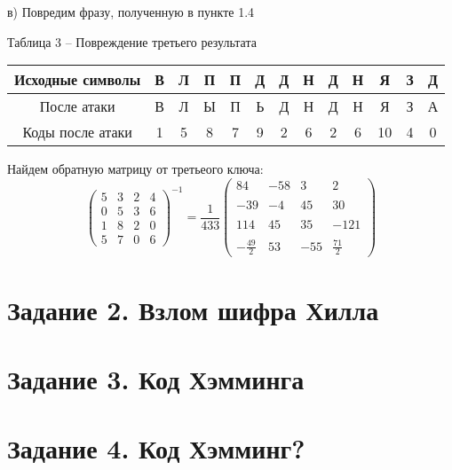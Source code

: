\documentclass[a5paper, 10pt]{article}
\theoremstyle{definition}
\theoremstyle{plain}
\theoremstyle{remark}
\begin{document}
 в) Повредим фразу, полученную в пункте 1.4
\begin{center}
Таблица 3 -- Повреждение третьего результата\\
\begin{tabular}{ |c|c|c|c|c|c|c|c|c|c|c|c|c| } 
 \hline
Исходные символы & В & Л & П & П & Д  & Д & Н  & Д & Н  & Я & З  & Д\\
\hline
После атаки  & В & Л & Ы & П & Ь  & Д & Н  & Д & Н  & Я & З  & А \\
 \hline
Коды после атаки & 1 & 5 & 8 & 7 & 9  & 2 & 6  & 2 & 6  & 10 & 4  & 0  \\
 \hline
\end{tabular}
\end{center}
Найдем обратную матрицу от третьеого ключа:
\begin{equation}
\begin{pmatrix}
 5 & 3 & 2 & 4 \\
 0 & 5 & 3 & 6 \\
1& 8 & 2 & 0\\
 5 & 7 & 0 & 6
\end{pmatrix}^{-1}
=  \frac{1}{433}\begin{pmatrix}
  84 & -58 & 3 & 2 \\
\\
 -39 & -4 & 45 & 30 \\
\\
114 & 45 & 35 & -121\\
\\
 - \frac{49}{2} & 53 & -55 &  \frac{71}{2}
\end{pmatrix}
\end{equation}

\section{Задание 2. Взлом шифра Хилла}	

\section{Задание 3. Код Хэмминга}

\section{Задание 4. Код Хэмминг?}
\end{document}
